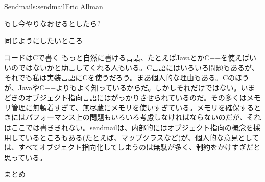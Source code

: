 \begin{aosachapter}{Sendmail}{s:sendmail}{Eric Allman}
\begin{aosasect1}{もし今やりなおせるとしたら?}
\begin{aosasect2}{同じようにしたいところ}
\begin{aosasect3}{コードはCで書く}
もっと自然に書ける言語、たとえばJavaとかC++を使えばいいのではないかと助言してくれる人もいる。C言語にはいろいろ問題もあるが、それでも私は実装言語にCを使うだろう。まあ個人的な理由もある。Cのほうが、JavaやC++よりもよく知っているからだ。しかしそれだけではない。いまどきのオブジェクト指向言語にはがっかりさせられているのだ。その多くはメモリ管理に無頓着すぎて、無尽蔵にメモリを使いすぎている。メモリを確保するときにはパフォーマンス上の問題もいろいろ考慮しなければならないのだが、それはここでは書ききれない。sendmailは、内部的にはオブジェクト指向の概念を採用しているところもある(たとえば、マップクラスなど)が、個人的な意見としては、すべてオブジェクト指向化してしまうのは無駄が多く、制約をかけすぎだと思っている。

\end{aosasect3}

\end{aosasect2}

\end{aosasect1}

\begin{aosasect1}{まとめ}


\end{aosasect1}
\end{aosachapter}

